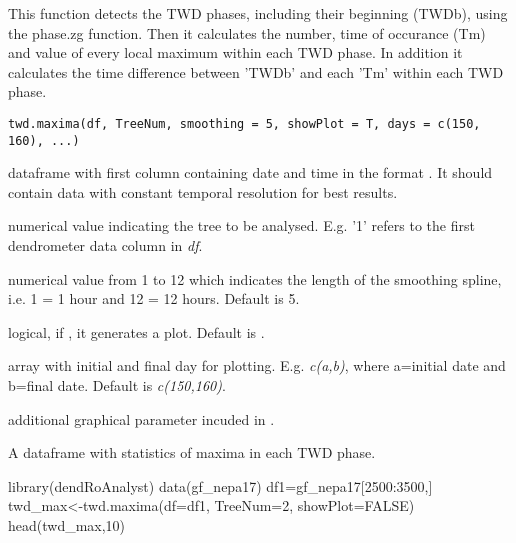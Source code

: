 \documentclass[a4paper]{book}
\begin{document}
%
\begin{Description}\relax
This function detects the TWD phases, including their beginning (TWDb), using the phase.zg function. Then it calculates the number, time of occurance (Tm) and value of every local maximum within each TWD phase. In addition it calculates the time difference between 'TWDb' and each 'Tm' within each TWD phase.
\end{Description}
%
\begin{Usage}
\begin{verbatim}
twd.maxima(df, TreeNum, smoothing = 5, showPlot = T, days = c(150, 160), ...)
\end{verbatim}
\end{Usage}
%
\begin{Arguments}
\begin{ldescription}
\item[\code{df}] dataframe with first column containing date and time in the format . It should contain data with constant temporal resolution for best results.

\item[\code{TreeNum}] numerical value indicating the tree to be analysed. E.g. '1' refers to the first dendrometer data column in \emph{df}.

\item[\code{smoothing}] numerical value from 1 to 12 which indicates the length of the smoothing spline, i.e. 1 = 1 hour and 12 = 12 hours. Default is 5.

\item[\code{showPlot}] logical, if , it generates a plot. Default is .

\item[\code{days}] array with initial and final day for plotting. E.g. \emph{c(a,b)}, where a=initial date and b=final date. Default is \emph{c(150,160)}.

\item[\code{...}] additional graphical parameter incuded in .
\end{ldescription}
\end{Arguments}
%
\begin{Value}
A dataframe with statistics of maxima in each TWD phase.
\end{Value}
%
\begin{Examples}
\begin{ExampleCode}
library(dendRoAnalyst)
data(gf_nepa17)
df1=gf_nepa17[2500:3500,]
twd_max<-twd.maxima(df=df1, TreeNum=2, showPlot=FALSE)
head(twd_max,10)

\end{ExampleCode}
\end{Examples}
\printindex{}
\end{document}

